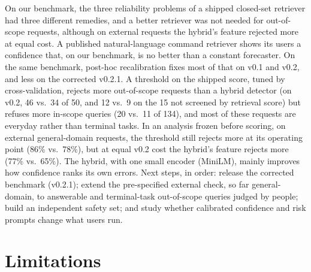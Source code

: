 On our benchmark, the three reliability problems of a shipped closed-set retriever had three different remedies,
and a better retriever was not needed for out-of-scope requests, although on external requests the hybrid's
feature rejected more at equal cost. A published natural-language command retriever shows its users a confidence that, on our benchmark, is no better
than a constant forecaster. On the same benchmark, post-hoc recalibration fixes most of that on v0.1 and v0.2, and less on the corrected
v0.2.1. A threshold on the
shipped score, tuned by cross-validation, rejects more out-of-scope requests than a hybrid detector (on v0.2, 46 vs.\
34 of 50, and 12 vs.\ 9 on the 15 not screened by retrieval score) but refuses more in-scope queries (20 vs.\ 11 of 134), and
most of these requests are everyday rather than terminal tasks. In an analysis frozen before scoring, on external
general-domain requests, the threshold still rejects more at its operating point (86\% vs.\ 78\%), but at equal
v0.2 cost the hybrid's feature rejects more (77\% vs.\ 65\%). The hybrid, with one small encoder (MiniLM), mainly improves how
confidence ranks its own errors. Next steps, in order:
release the corrected benchmark (v0.2.1); extend the pre-specified external check,
so far general-domain, to answerable and terminal-task out-of-scope queries judged by people; build an independent
safety set; and study whether calibrated confidence and risk prompts change what users run.

\label{endofbody}

\section*{Limitations}

